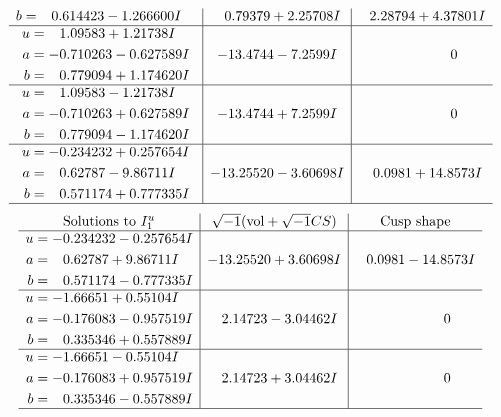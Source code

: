 \documentclass[1p]{elsarticle_modified}
\theoremstyle{definition}
\newcommand{\I}{\sqrt{-1}}
\begin{document}
$$\begin{array}{c|c|c}
\begin{aligned}
b &= \phantom{-}0.614423 - 1.266600 I\end{aligned}
 & \phantom{-}0.79379 + 2.25708 I & \phantom{-}2.28794 + 4.37801 I \\ \hline\begin{aligned}
u &= \phantom{-}1.09583 + 1.21738 I \\
a &= -0.710263 - 0.627589 I \\
b &= \phantom{-}0.779094 + 1.174620 I\end{aligned}
 & -13.4744 - 7.2599 I & \phantom{-0.000000 } 0 \\ \hline\begin{aligned}
u &= \phantom{-}1.09583 - 1.21738 I \\
a &= -0.710263 + 0.627589 I \\
b &= \phantom{-}0.779094 - 1.174620 I\end{aligned}
 & -13.4744 + 7.2599 I & \phantom{-0.000000 } 0 \\ \hline\begin{aligned}
u &= -0.234232 + 0.257654 I \\
a &= \phantom{-}0.62787 - 9.86711 I \\
b &= \phantom{-}0.571174 + 0.777335 I\end{aligned}
 & -13.25520 - 3.60698 I & \phantom{-}0.0981 + 14.8573 I\\
 \hline 
 \end{array}$$\newpage$$\begin{array}{c|c|c}  
\text{Solutions to }I^u_{1}& \I (\text{vol} + \sqrt{-1}CS) & \text{Cusp shape}\\
 \hline 
\begin{aligned}
u &= -0.234232 - 0.257654 I \\
a &= \phantom{-}0.62787 + 9.86711 I \\
b &= \phantom{-}0.571174 - 0.777335 I\end{aligned}
 & -13.25520 + 3.60698 I & \phantom{-}0.0981 - 14.8573 I \\ \hline\begin{aligned}
u &= -1.66651 + 0.55104 I \\
a &= -0.176083 - 0.957519 I \\
b &= \phantom{-}0.335346 + 0.557889 I\end{aligned}
 & \phantom{-}2.14723 - 3.04462 I & \phantom{-0.000000 } 0 \\ \hline\begin{aligned}
u &= -1.66651 - 0.55104 I \\
a &= -0.176083 + 0.957519 I \\
b &= \phantom{-}0.335346 - 0.557889 I\end{aligned}
 & \phantom{-}2.14723 + 3.04462 I & \phantom{-0.000000 } 0\\
 \hline 
 \end{array}$$\newpage\newpage\renewcommand{\arraystretch}{1}
\end{document}
